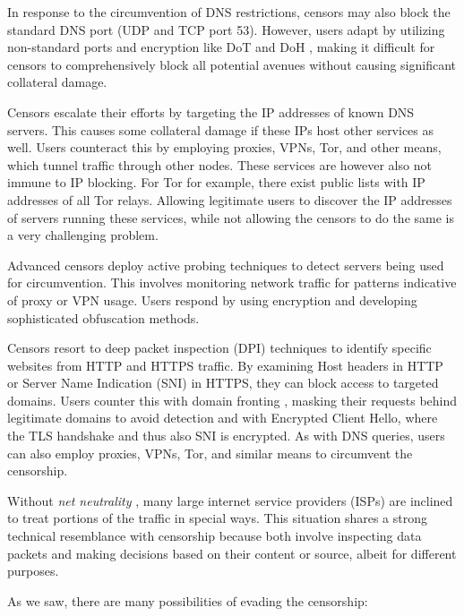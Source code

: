 In response to the circumvention of DNS restrictions, censors may also block the standard DNS port (UDP and TCP port 53).
However, users adapt by utilizing non-standard ports \cite{dns-nonstandard-port} and encryption like DoT \cite{wiki:DNS_over_TLS} and DoH \cite{wiki:DNS_over_HTTPS}, making it difficult for censors to comprehensively block all potential avenues without causing significant collateral damage.

Censors escalate their efforts by targeting the IP addresses of known DNS servers.
This causes some collateral damage if these IPs host other services as well.
Users counteract this by employing proxies, VPNs, Tor, and other means, which tunnel traffic through other nodes.
These services are however also not immune to IP blocking.
For Tor for example, there exist public lists with IP addresses of all Tor relays.
Allowing legitimate users to discover the IP addresses of servers running these services, while not allowing the censors to do the same is a very challenging problem.

Advanced censors deploy active probing techniques to detect servers being used for circumvention.
This involves monitoring network traffic for patterns indicative of proxy or VPN usage.
Users respond by using encryption and developing sophisticated obfuscation methods.

Censors resort to deep packet inspection (DPI) techniques to identify specific websites from HTTP and HTTPS traffic.
By examining Host headers in HTTP or Server Name Indication (SNI) in HTTPS, they can block access to targeted domains.
Users counter this with domain fronting \cite{wiki:Domain_fronting}, masking their requests behind legitimate domains to avoid detection and with Encrypted Client Hello, where the TLS handshake and thus also SNI is encrypted.
As with DNS queries, users can also employ proxies, VPNs, Tor, and similar means to circumvent the censorship.

Without \textit{net neutrality} \cite{wiki:Net_neutrality}, many large internet service providers (ISPs) are inclined to treat portions of the traffic in special ways.
This situation shares a strong technical resemblance with censorship because both involve inspecting data packets and making decisions based on their content or source, albeit for different purposes.

As we saw, there are many possibilities of evading the censorship:

